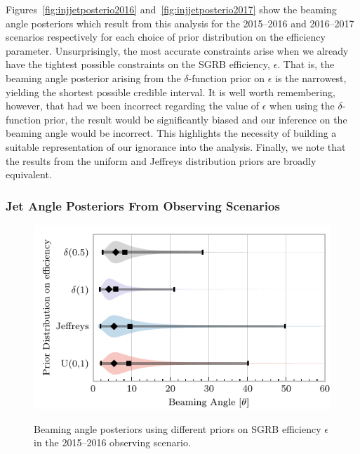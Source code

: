 \documentclass[twocolumn]{aastex61}
\begin{document}
%
Figures~\ref{fig:injjetposterio2016} and~\ref{fig:injjetposterio2017}
show the beaming angle posteriors which result from this analysis for
the 2015--2016 and 2016--2017 scenarios respectively for each choice
of prior distribution on the efficiency parameter.  Unsurprisingly,
the most accurate constraints arise when we already have the tightest
possible constraints on the \ac{SGRB} efficiency, $\epsilon$.  That
is, the beaming angle posterior arising from the $\delta$-function
prior on $\epsilon$ is the narrowest, yielding the shortest possible
credible interval.  It is well worth remembering, however, that had
we been incorrect regarding the value of $\epsilon$ when using the
$\delta$-function prior, the result would be significantly biased and
our inference on the beaming angle would be incorrect.  This
highlights the necessity of building a suitable representation of our
ignorance into the analysis.  Finally, we note that the results from
the uniform and Jeffreys distribution priors are broadly equivalent.


\subsubsection{Jet Angle Posteriors From Observing Scenarios}

\begin{figure}
\centering
{\includegraphics[width=\linewidth]{O1_beaming_posteriors_violin.pdf}}
\caption{Beaming angle posteriors using different priors on \ac{SGRB} efficiency $\epsilon$ in the 2015--2016 observing scenario.
    \label{fig:jetposterior2016}}
\end{figure}
\end{document}
